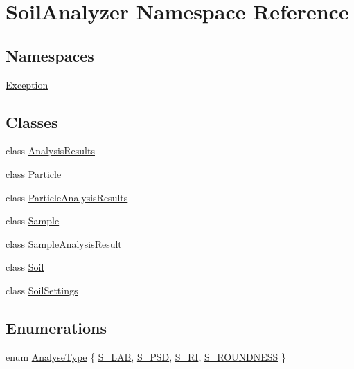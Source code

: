 \hypertarget{namespace_soil_analyzer}{}\section{Soil\+Analyzer Namespace Reference}
\label{namespace_soil_analyzer}
\subsection*{Namespaces}
\begin{DoxyCompactItemize}
\item 
 \hyperlink{namespace_soil_analyzer_1_1_exception}{Exception}
\end{DoxyCompactItemize}
\subsection*{Classes}
\begin{DoxyCompactItemize}
\item 
class \hyperlink{class_soil_analyzer_1_1_analysis_results}{Analysis\+Results}
\item 
class \hyperlink{class_soil_analyzer_1_1_particle}{Particle}
\item 
class \hyperlink{class_soil_analyzer_1_1_particle_analysis_results}{Particle\+Analysis\+Results}
\item 
class \hyperlink{class_soil_analyzer_1_1_sample}{Sample}
\item 
class \hyperlink{class_soil_analyzer_1_1_sample_analysis_result}{Sample\+Analysis\+Result}
\item 
class \hyperlink{class_soil_analyzer_1_1_soil}{Soil}
\item 
class \hyperlink{class_soil_analyzer_1_1_soil_settings}{Soil\+Settings}
\end{DoxyCompactItemize}
\subsection*{Enumerations}
\begin{DoxyCompactItemize}
\item 
enum \hyperlink{namespace_soil_analyzer_a4fda1552be67ca3afa21a0e328ce20b1}{Analyse\+Type} \{ \hyperlink{namespace_soil_analyzer_a4fda1552be67ca3afa21a0e328ce20b1a00a4725e08e412784be26a1712ddc0e8}{S\+\_\+\+L\+A\+B}, 
\hyperlink{namespace_soil_analyzer_a4fda1552be67ca3afa21a0e328ce20b1a05f4e00557f8e26c29892bde8a130df6}{S\+\_\+\+P\+S\+D}, 
\hyperlink{namespace_soil_analyzer_a4fda1552be67ca3afa21a0e328ce20b1a2e919e63ee899d56718e0f9143983fb8}{S\+\_\+\+R\+I}, 
\hyperlink{namespace_soil_analyzer_a4fda1552be67ca3afa21a0e328ce20b1ad2ec0fc01286dbe9e8a1b08c5fa20c1f}{S\+\_\+\+R\+O\+U\+N\+D\+N\+E\+S\+S}
 \}
\end{DoxyCompactItemize}


